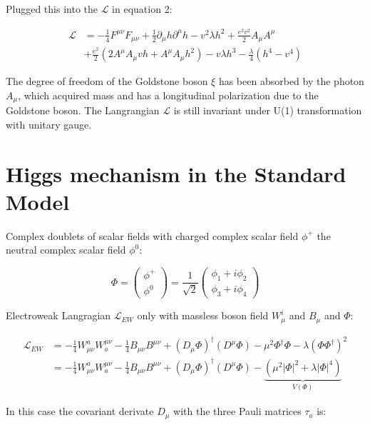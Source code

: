 \documentclass[12pt,oneside]{book}
\begin{document}
Plugged this into the $\mathcal{L}$ in equation 2:

\begin{align}
    \mathcal{L} &= -\frac{1}{4}F^{\mu\nu}F_{\mu\nu} + \frac{1}{2}\partial_\mu h\partial^{\mu}h - v^2\lambda h^2 + \frac{e^2v^2}{2}A_\mu A^\mu \\ 
              &+ \frac{e^2}{2}(2A^\mu A_\mu vh + A^\mu A_\mu h^2) - v\lambda h^3 - \frac{\lambda}{4}(h^4 -v^4) \nonumber
\end{align}

The degree of freedom of the Goldstone boson $\xi$ has been absorbed by the photon $A_\mu$, which acquired mass and has a longitudinal polarization due to the Goldstone boson. The Langrangian $\mathcal{L}$ is still invariant under U(1) transformation with unitary gauge. \newpage

\section*{Higgs mechanism in the Standard Model}

Complex doublets of scalar fields with charged complex scalar field $\phi^+$ the neutral complex scalar field $\phi^{0}$:

\begin{equation}
    \Phi = \begin{pmatrix} \phi^{+} \\ \phi^{0} \end{pmatrix} = \frac{1}{\sqrt{2}}\begin{pmatrix} \phi_1 + i\phi_2 \\ \phi_3 + i\phi_4 \end{pmatrix}
\end{equation}

Electroweak Langragian $\mathcal{L}_{EW}$ only with massless boson field $W_\mu^{i}$ and $B_\mu$ and $\Phi$:

\begin{align}
    \mathcal{L}_{EW} &= -\frac{1}{4} W^{a}_{\mu\nu}W^{\mu\nu}_a -\frac{1}{4} B_{\mu\nu}B^{\mu\nu} + (D_{\mu} \Phi)^{\dagger}(D^{\mu} \Phi) - \mu^2\Phi^{\dagger}\Phi - \lambda(\Phi\Phi^{\dagger})^2 \\
                    &=  -\frac{1}{4} W^{a}_{\mu\nu}W^{\mu\nu}_a -\frac{1}{4} B_{\mu\nu}B^{\mu\nu} + (D_{\mu} \Phi)^{\dagger}(D^{\mu} \Phi) - \underbrace{(\mu^2|\Phi|^2 + \lambda|\Phi|^4)}_{V(\Phi)} \nonumber
\end{align}

In this case the covariant derivate $D_\mu$ with the three Pauli matrices $\tau_a$ is:
\end{document}
